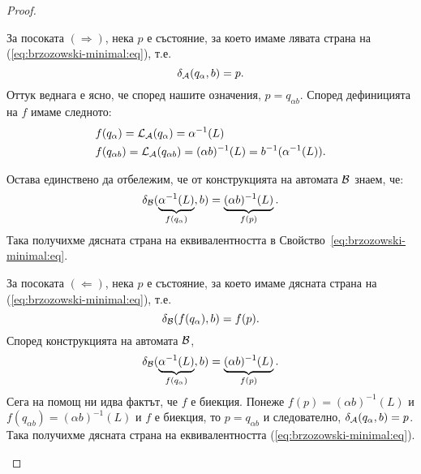\begin{proof}
\begin{itemize}
    За посоката $(\Rightarrow)$, нека $p$ е състояние, за което имаме лявата страна на (\ref{eq:brzozowski-minimal:eq}), т.е.
    \[\delta_{\mathcal{A}}(q_\alpha,b) = p.\]
    Оттук веднага е ясно, че според нашите означения, $p = q_{\alpha b}$.
    Според дефиницията на $f$ имаме следното:
    \begin{align*}
      & f(q_{\alpha}) = \mathcal{L}_{\mathcal{A}}(q_\alpha) = \alpha^{-1}(L)\\
      & f(q_{\alpha b}) = \mathcal{L}_{\mathcal{A}}(q_{\alpha b}) = (\alpha b)^{-1}(L) = b^{-1}(\alpha^{-1}(L)).
    \end{align*}




    Остава единствено да отбележим, че от конструкцията на автомата $\mathcal{B}$ знаем, че:
    \[\delta_{\mathcal{B}}(\underbrace{\alpha^{-1}(L)}_{f(q_{\alpha})},b) = \underbrace{(\alpha b)^{-1}(L)}_{f(p)}.\]
    Така получихме дясната страна на еквивалентността в Свойство~\ref{eq:brzozowski-minimal:eq}.
    
    За посоката $(\Leftarrow)$, нека $p$ е състояние, за което имаме дясната страна на (\ref{eq:brzozowski-minimal:eq}), т.е.
    \[\delta_{\mathcal{B}}(f(q_{\alpha}),b) = f(p).\]
    Според конструкцията на автомата $\mathcal{B}$,
    \[\delta_{\mathcal{B}}(\underbrace{\alpha^{-1}(L)}_{f(q_\alpha)},b) = \underbrace{(\alpha b)^{-1}(L)}_{f(p)}.\]
    Сега на помощ ни идва фактът, че $f$ е биекция.
    Понеже $f(p) = (\alpha b)^{-1}(L)$ и $f(q_{\alpha b}) = (\alpha b)^{-1}(L)$ и $f$ е биекция, то
    $p = q_{\alpha b}$ и следователно, $\delta_{\mathcal{A}}(q_\alpha, b) = p$.
    Така получихме дясната страна на еквивалентността (\ref{eq:brzozowski-minimal:eq}).
  \end{itemize}
\end{proof}

